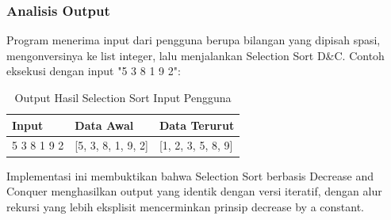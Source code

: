 \subsubsection*{Analisis Output}
Program menerima input dari pengguna berupa bilangan yang dipisah spasi, mengonversinya ke list integer, lalu menjalankan Selection Sort D\&C. Contoh eksekusi dengan input "5 3 8 1 9 2":

\begin{table}[H]
    \centering
    \caption{Output Hasil Selection Sort Input Pengguna}
    \begin{tabular}{lll}
    \toprule
    \textbf{Input} & \textbf{Data Awal} & \textbf{Data Terurut} \\ \midrule
    5 3 8 1 9 2 & [5, 3, 8, 1, 9, 2] & [1, 2, 3, 5, 8, 9] \\ \bottomrule
    \end{tabular}
\end{table}

Implementasi ini membuktikan bahwa Selection Sort berbasis Decrease and Conquer menghasilkan output yang identik dengan versi iteratif, dengan alur rekursi yang lebih eksplisit mencerminkan prinsip decrease by a constant.